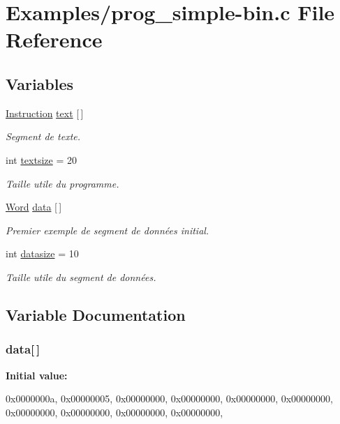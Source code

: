 \hypertarget{prog__simple-bin_8c}{\section{\-Examples/prog\-\_\-simple-\/bin.c \-File \-Reference}
\label{prog__simple-bin_8c}
}
\subsection*{\-Variables}
\begin{DoxyCompactItemize}
\item 
\hyperlink{union_instruction}{\-Instruction} \hyperlink{prog__simple-bin_8c_a53ae7c86b11d9a664628491ba41ca09d}{text} \mbox{[}$\,$\mbox{]}
\begin{DoxyCompactList}\small\item\em \-Segment de texte. \end{DoxyCompactList}\item 
int \hyperlink{prog__simple-bin_8c_a09c9805cec0364d715497e6564245c48}{textsize} = 20
\begin{DoxyCompactList}\small\item\em \-Taille utile du programme. \end{DoxyCompactList}\item 
\hyperlink{instruction_8h_a0b5b15ce5f3a75b5dd0de6643cd3d958}{\-Word} \hyperlink{prog__simple-bin_8c_a0a1a7765b8d407ad9c19649d5a9dd699}{data} \mbox{[}$\,$\mbox{]}
\begin{DoxyCompactList}\small\item\em \-Premier exemple de segment de données initial. \end{DoxyCompactList}\item 
int \hyperlink{prog__simple-bin_8c_a5c7949e884a8b9b3d1ab9f070267bf33}{datasize} = 10
\begin{DoxyCompactList}\small\item\em \-Taille utile du segment de données. \end{DoxyCompactList}\end{DoxyCompactItemize}


\subsection{\-Variable \-Documentation}
\hypertarget{prog__simple-bin_8c_a0a1a7765b8d407ad9c19649d5a9dd699}{
\subsubsection[{data}]{ {\bf data}\mbox{[}$\,$\mbox{]}}}\label{prog__simple-bin_8c_a0a1a7765b8d407ad9c19649d5a9dd699}
{\bfseries \-Initial value\-:}
\begin{DoxyCode}
 {
    0x0000000a, 0x00000005, 0x00000000, 0x00000000, 
    0x00000000, 0x00000000, 0x00000000, 0x00000000, 
    0x00000000, 0x00000000, 
}
\end{DoxyCode}


